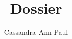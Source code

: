 \documentclass[12pt]{book}
\title{Dossier}
\author{Cassandra Ann Paul}
\begin{document}
\maketitle

\dominitoc
\faketableofcontents


\end{document}
